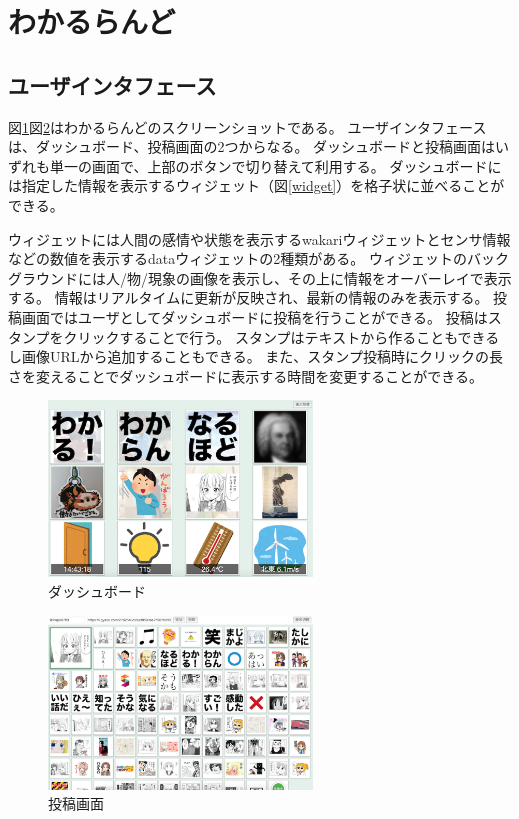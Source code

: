 \section{わかるらんど}

\subsection{ユーザインタフェース}

図\ref{dashboard}図\ref{console}はわかるらんどのスクリーンショットである。
ユーザインタフェースは、ダッシュボード、投稿画面の2つからなる。
ダッシュボードと投稿画面はいずれも単一の画面で、上部のボタンで切り替えて利用する。
ダッシュボードには指定した情報を表示するウィジェット（図\ref{widget}）を格子状に並べることができる。

ウィジェットには人間の感情や状態を表示するwakariウィジェットとセンサ情報などの数値を表示するdataウィジェットの2種類がある。
ウィジェットのバックグラウンドには人/物/現象の画像を表示し、その上に情報をオーバーレイで表示する。
情報はリアルタイムに更新が反映され、最新の情報のみを表示する。
投稿画面ではユーザとしてダッシュボードに投稿を行うことができる。
投稿はスタンプをクリックすることで行う。
スタンプはテキストから作ることもできるし画像URLから追加することもできる。
また、スタンプ投稿時にクリックの長さを変えることでダッシュボードに表示する時間を変更することができる。

\begin{figure}[h]
\centering
\includegraphics[width=7cm]{images/dashboard.eps}
\caption{ダッシュボード}
\label{dashboard}
\end{figure}

\begin{figure}[h]
\centering
\includegraphics[width=7cm]{images/console.eps}
\caption{投稿画面}
\label{console}
\end{figure}

